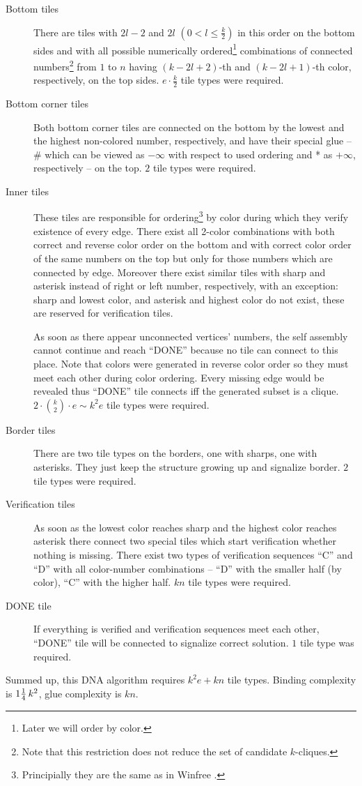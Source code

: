 \begin{description}
	\item[Bottom tiles] There are tiles with $2l-2$ and $2l$ $(0 < l \leq \frac{k}{2})$ in this order on the bottom sides and with all possible numerically ordered\footnote{Later we will order by color.} combinations of connected numbers\footnote{Note that this restriction does not reduce the set of candidate $k$-cliques.} from $1$ to $n$ having $(k-2l+2)$-th and $(k-2l+1)$-th color, respectively, on the top sides. $e\cdot \frac{k}{2}$ tile types were required.
	\item[Bottom corner tiles] Both bottom corner tiles are connected on the bottom by the lowest and the highest non-colored number, respectively, and have their special glue -- \# which can be viewed as $-\infty$ with respect to used ordering and * as $+\infty$, respectively -- on the top. $2$ tile types were required.
	\item[Inner tiles] These tiles are responsible for ordering\footnote{Principially they are the same as in Winfree \cite{winfree_phd}.} by color during which they verify existence of every edge. There exist all 2-color combinations with both correct and reverse color order on the bottom and with correct color order of the same numbers on the top but only for those numbers which are connected by edge. Moreover there exist similar tiles with sharp and asterisk instead of right or left number, respectively, with an exception: sharp and lowest color, and asterisk and highest color do not exist, these are reserved for verification tiles.
	
	As soon as there appear unconnected vertices' numbers, the self assembly cannot continue and reach ``DONE'' because no tile can connect to this place. Note that colors were generated in reverse color order so they must meet each other during color ordering. Every missing edge would be revealed thus ``DONE'' tile connects iff the generated subset is a clique. $2\cdot\binom{k}{2}\cdot e \sim k^2 e$ tile types were required.
	\item[Border tiles] There are two tile types on the borders, one with sharps, one with asterisks. They just keep the structure growing up and signalize border. $2$ tile types were required.
	\item[Verification tiles] As soon as the lowest color reaches sharp and the highest color reaches asterisk there connect two special tiles which start verification whether nothing is missing. There exist two types of verification sequences ``C'' and ``D'' with all color-number combinations -- ``D'' with the smaller half (by color), ``C'' with the higher half. $kn$ tile types were required.
	\item[DONE tile] If everything is verified and verification sequences meet each other, ``DONE'' tile will be connected to signalize correct solution. $1$ tile type was required.
\end{description}
Summed up, this DNA algorithm requires $k^2 e + kn$ tile types. Binding complexity is $1\nicefrac{1}{4}\,k^2$, glue complexity is $kn$.


